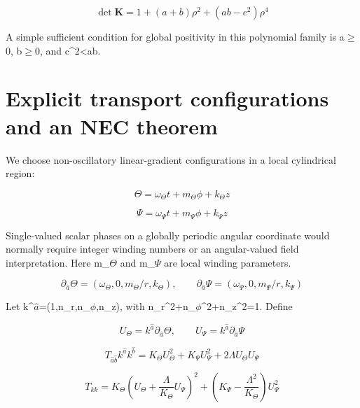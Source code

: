 \documentclass[aps,prd,preprint,nofootinbib,superscriptaddress]{revtex4-2}
\begin{document}
\begin{equation}
\det\mathbf K=1+(a+b)\rho^2+(ab-c^2)\rho^4
\tag{24}\label{eq:24}
\end{equation}

A simple sufficient condition for global positivity in this polynomial family is a$\geq$0, b$\geq$0, and c\textasciicircum{}2<ab.


\section{Explicit transport configurations and an NEC theorem}

We choose non-oscillatory linear-gradient configurations in a local cylindrical region:


\begin{equation}
\Theta=\omega_\Theta t+m_\Theta\phi+k_\Theta z
\tag{25}\label{eq:25}
\end{equation}

\begin{equation}
\Psi=\omega_\Psi t+m_\Psi\phi+k_\Psi z
\tag{26}\label{eq:26}
\end{equation}

Single-valued scalar phases on a globally periodic angular coordinate would normally require integer winding numbers or an angular-valued field interpretation. Here m\_$\Theta$ and m\_$\Psi$ are local winding parameters.


\begin{equation}
\partial_{\hat a}\Theta=(\omega_\Theta,0,m_\Theta/r,k_\Theta),\qquad \partial_{\hat a}\Psi=(\omega_\Psi,0,m_\Psi/r,k_\Psi)
\tag{27}\label{eq:27}
\end{equation}

Let k\textasciicircum{}$\hat a$=(1,n\_r,n\_$\phi$,n\_z), with n\_r\textasciicircum{}2+n\_$\phi$\textasciicircum{}2+n\_z\textasciicircum{}2=1. Define


\begin{equation}
U_\Theta=k^{\hat a}\partial_{\hat a}\Theta,\qquad U_\Psi=k^{\hat a}\partial_{\hat a}\Psi
\tag{28}\label{eq:28}
\end{equation}

\begin{equation}
T_{\hat a\hat b}k^{\hat a}k^{\hat b}=K_\Theta U_\Theta^2+K_\Psi U_\Psi^2+2\Lambda U_\Theta U_\Psi
\tag{29}\label{eq:29}
\end{equation}

\begin{equation}
T_{kk}=K_\Theta\left(U_\Theta+\frac{\Lambda}{K_\Theta}U_\Psi\right)^2+\left(K_\Psi-\frac{\Lambda^2}{K_\Theta}\right)U_\Psi^2
\tag{30}\label{eq:30}
\end{equation}
\end{document}
